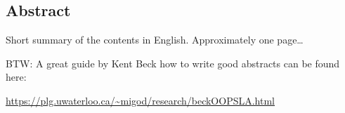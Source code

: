 

\begin{otherlanguage}{american}
	\chapter*{Abstract}
	Short summary of the contents in English. Approximately one page\dots
	\medskip
	
	\noindent
	BTW: A great guide by Kent Beck how to write good abstracts can be found here:
	\begin{center}
		\url{https://plg.uwaterloo.ca/~migod/research/beckOOPSLA.html}
	\end{center}
\end{otherlanguage}